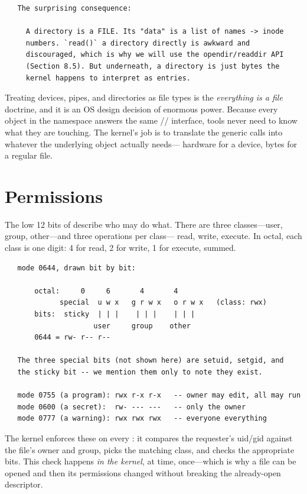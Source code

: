 \begin{verbatim}
   The surprising consequence:

     A directory is a FILE. Its "data" is a list of names -> inode
     numbers. `read()` a directory directly is awkward and
     discouraged, which is why we will use the opendir/readdir API
     (Section 8.5). But underneath, a directory is just bytes the
     kernel happens to interpret as entries.
\end{verbatim}

\begin{osconcept}
Treating devices, pipes, and directories as file types is the
\emph{everything is a file} doctrine, and it is an OS design decision
of enormous power. Because every object in the namespace answers the
same // interface, tools never need
to know what they are touching. The kernel's job is to translate the
generic calls into whatever the underlying object actually needs---
hardware for a device, bytes for a regular file.
\end{osconcept}

\section{Permissions}

The low 12 bits of  describe who may do what. There are
three classes---user, group, other---and three operations per class---
read, write, execute. In octal, each class is one digit: 4 for read,
2 for write, 1 for execute, summed.

\begin{verbatim}
   mode 0644, drawn bit by bit:

       octal:     0     6       4       4
             special  u w x   g r w x   o r w x   (class: rwx)
       bits:  sticky  | | |    | | |    | | |
                     user     group    other
       0644 = rw- r-- r--

   The three special bits (not shown here) are setuid, setgid, and
   the sticky bit -- we mention them only to note they exist.

   mode 0755 (a program): rwx r-x r-x   -- owner may edit, all may run
   mode 0600 (a secret):  rw- --- ---   -- only the owner
   mode 0777 (a warning): rwx rwx rwx   -- everyone everything
\end{verbatim}

The kernel enforces these on every : it compares the
requester's uid/gid against the file's owner and group, picks the
matching class, and checks the appropriate bits. This check happens
\emph{in the kernel}, at  time, once---which is why a file
can be opened and then its permissions changed without breaking the
already-open descriptor.

